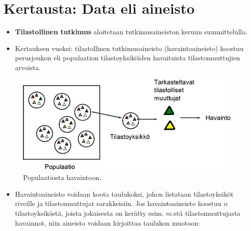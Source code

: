 \documentclass[
]{book}
\providecommand{\tightlist}{%
  \setlength{\itemsep}{0pt}\setlength{\parskip}{0pt}}
\begin{document}
\hypertarget{alaluku51}{%
\section{Kertausta: Data eli aineisto}\label{alaluku51}}

\begin{itemize}
\tightlist
\item
  \textbf{Tilastollinen tutkimus} aloitetaan tutkimusaineiston keruun suunnittelulla.
\item
  Kertauksen vuoksi: tilastollinen tutkimusaineisto (havaintoaineisto) koostuu perusjoukon eli populaation tilastoyksiköiden havaituista tilastomuuttujien arvoista.
\end{itemize}

\begin{figure}
\includegraphics[width=0.9\linewidth]{images/populaatiostahavaintoon} \caption{Populaatiosta havaintoon.}\label{fig:pophav}
\end{figure}

\begin{itemize}
\tightlist
\item
  Havaintoaineisto voidaan koota taulukoksi, johon listataan tilastoyksiköt riveille ja tilastomuuttujat sarakkeisiin. Jos havaintoaineisto koostuu \(n\) tilastoyksiköstä, joista jokaisesta on kerätty esim. \(m\):stä tilastomuuttujasta havainnot, niin aineisto voidaan kirjoittaa taulukon muotoon:
\end{itemize}
\end{document}
